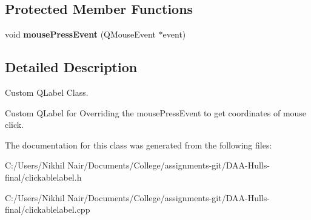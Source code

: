 \subsection*{Protected Member Functions}
\begin{DoxyCompactItemize}
\item 
\mbox{\label{class_clickable_label_a602a8b3a3fa31497f31e549d46576524}} 
void {\bfseries mouse\+Press\+Event} (Q\+Mouse\+Event $\ast$event)
\end{DoxyCompactItemize}


\subsection{Detailed Description}
Custom Q\+Label Class. 

Custom Q\+Label for Overriding the mouse\+Press\+Event to get coordinates of mouse click. 

The documentation for this class was generated from the following files\+:\begin{DoxyCompactItemize}
\item 
C\+:/\+Users/\+Nikhil Nair/\+Documents/\+College/assignments-\/git/\+D\+A\+A-\/\+Hulls-\/final/clickablelabel.\+h\item 
C\+:/\+Users/\+Nikhil Nair/\+Documents/\+College/assignments-\/git/\+D\+A\+A-\/\+Hulls-\/final/clickablelabel.\+cpp\end{DoxyCompactItemize}
